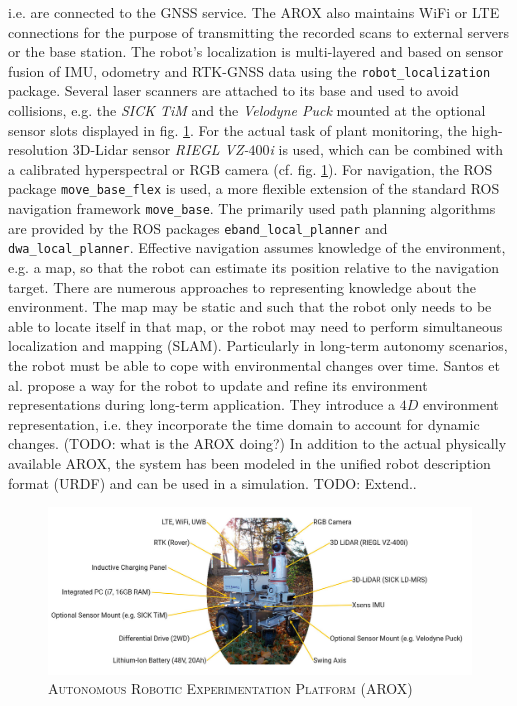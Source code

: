 \documentclass[english, master, utf8]{base/thesis_KBS}
\newcommand{\code}[1]{\colorbox{light-gray}{\texttt{#1}}}
\begin{document}
i.e. are connected to the GNSS service. The AROX also maintains WiFi or LTE connections for the purpose of transmitting the recorded scans to external servers or the base station.
The robot's localization is multi-layered and based on sensor fusion of IMU, odometry and RTK-GNSS data using the \code{robot\_localization} \cite{Moore:2014} package.
Several laser scanners are attached to its base and used to avoid collisions, e.g. the \textit{SICK TiM} and the \textit{Velodyne Puck} mounted at the optional sensor
slots displayed in fig. \ref{fig:arox_system}. For the actual task of plant monitoring, the high-resolution 3D-Lidar sensor \textit{RIEGL VZ-$400$i} is used,
which can be combined with a calibrated hyperspectral or RGB camera (cf. fig. \ref{fig:arox_system}). \cite{Kisliuk:2021}
For navigation, the ROS package \code{move\_base\_flex} \cite{Puetz:2018} is used, a more flexible extension of the standard ROS navigation framework \code{move\_base}.
The primarily used path planning algorithms are provided by the ROS packages \code{eband\_local\_planner} and \code{dwa\_local\_planner}.
Effective navigation assumes knowledge of the environment, e.g. a map, so that the robot can estimate its position relative to the navigation target. \cite{Krajnik:2010}
There are numerous approaches to representing knowledge about the environment. The map may be static and such that the robot only needs to be able to locate itself in that
map, or the robot may need to perform simultaneous localization and mapping (SLAM). \cite{Krajnik:2010} Particularly in long-term autonomy scenarios, the robot must be able to cope
with environmental changes over time. Santos et al. propose a way for the robot to update and refine its environment representations during long-term application. \cite{Santos:2016}
They introduce a $4D$ environment representation, i.e. they incorporate the time domain to account for dynamic changes. (TODO: what is the AROX doing?)
In addition to the actual physically available AROX, the system has been modeled in the unified robot description format (URDF) and can be used in a simulation. TODO: Extend..
\begin{figure}[H]
    \centering
    \includegraphics[width=\textwidth]{pics/AROX.jpg}
    \caption{\textsc{Autonomous Robotic Experimentation Platform (AROX)}}
    \label{fig:arox_system}
\end{figure}
\end{document}
